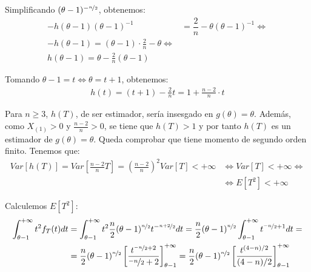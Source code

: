 \documentclass[12pt]{article}
\begin{document}
\begin{ejercicio}[2.5 puntos]
\begin{enumerate}[label=\alph*)]
            Simplificando $(\theta-1)^{-\nicefrac{n}{2}}$, obtenemos:
            \begin{align*}
                -h(\theta-1) (\theta-1)^{-1} &= \dfrac{2}{n} - \theta (\theta-1)^{-1} \iff\\
                -h(\theta-1) = (\theta-1)\cdot \frac{2}{n} - \theta \iff\\
                h(\theta-1) = \theta - \frac{2}{n}(\theta-1)
            \end{align*}

            Tomando $\theta-1 = t\iff \theta = t+1$, obtenemos:
            \begin{align*}
                h(t) = (t+1) - \frac{2}{n} t = 1 + \frac{n-2}{n}\cdot t
            \end{align*}

            Para $n\geq 3$, $h(T)$, de ser estimador, sería insesgado en $g(\theta) = \theta$. Además, como $X_{(1)} > 0$ y $\frac{n-2}{n} > 0$, se tiene que $h(T)>1$ y por tanto $h(T)$ es un estimador de $g(\theta) = \theta$. Queda comprobar que tiene momento de segundo orden finito. Tenemos que:
            \begin{align*}
                Var[h(T)] = Var\left[\frac{n-2}{n}T\right] = \left(\frac{n-2}{n}\right)^2 Var[T] < +\infty &\iff Var[T] < +\infty \iff\\&\iff E[T^2] < +\infty
            \end{align*}

            Calculemos $E[T^2]$:
            \begin{align*}
                \int_{\theta-1}^{+\infty} t^2 f_T(t) dt &= \int_{\theta-1}^{+\infty} t^2 \dfrac{n}{2} (\theta-1)^{\nicefrac{n}{2}} t^{-\nicefrac{n+2}{2}} dt = \dfrac{n}{2} (\theta-1)^{\nicefrac{n}{2}} \int_{\theta-1}^{+\infty} t^{\nicefrac{-n}{2}+1} dt
                =\\&= \dfrac{n}{2} (\theta-1)^{\nicefrac{n}{2}} \left[ \dfrac{t^{\nicefrac{-n}{2}+2}}{\nicefrac{-n}{2}+2} \right]_{\theta-1}^{+\infty} = \dfrac{n}{2} (\theta-1)^{\nicefrac{n}{2}} \left[ \dfrac{t^{(4-n)/2}}{(4-n)/2} \right]_{\theta-1}^{+\infty}
            \end{align*}


\end{enumerate}
\end{ejercicio}
\end{document}

